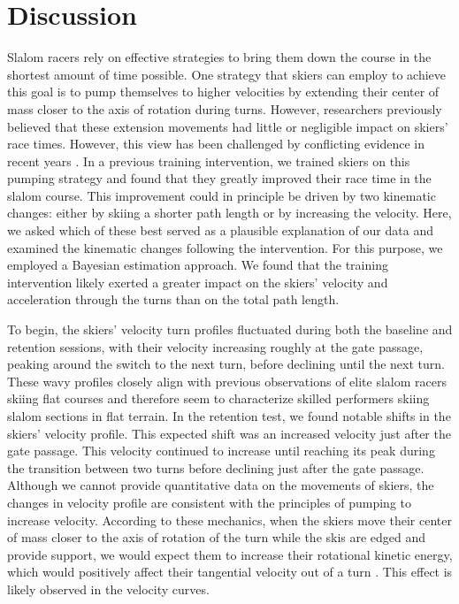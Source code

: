 \documentclass{article}
\begin{document}
\section{Discussion}

Slalom racers rely on effective strategies to bring them down the course in the shortest amount of time possible. One strategy that skiers can employ to achieve this goal is to pump themselves to higher velocities by extending their center of mass closer to the axis of rotation during turns\cite{lind_physics_2013}. However, researchers previously believed that these extension movements had little or negligible impact on skiers' race times. However, this view has been challenged by conflicting evidence in recent years \cite{supej_impact_2015, reid_kinematic_2010, supej_differential_2008, christian_magelssen_reinforcement_2024, magelssen_is_2022, supej_how_2010}. In a previous training intervention\cite{magelssen_is_2022}, we trained skiers on this pumping strategy and found that they greatly improved their race time in the slalom course. This improvement could in principle be driven by two kinematic changes: either by skiing a shorter path length or by increasing the velocity. Here, we asked which of these best served as a plausible explanation of our data and examined the kinematic changes following the intervention. For this purpose, we employed a Bayesian estimation approach. We found that the training intervention likely exerted a greater impact on the skiers' velocity and acceleration through the turns than on the total path length.

To begin, the skiers' velocity turn profiles fluctuated during both the baseline and retention sessions, with their velocity increasing roughly at the gate passage, peaking around the switch to the next turn, before declining until the next turn. These wavy profiles closely align with previous observations of elite slalom racers skiing flat courses \cite{supej_impact_2015} and therefore seem to characterize skilled performers skiing slalom sections in flat terrain. In the retention test, we found notable shifts in the skiers' velocity profile. This expected shift was an increased velocity just after the gate passage. This velocity continued to increase until reaching its peak during the transition between two turns before declining just after the gate passage. Although we cannot provide quantitative data on the movements of skiers, the changes in velocity profile are consistent with the principles of pumping to increase velocity. According to these mechanics, when the skiers move their center of mass closer to the axis of rotation of the turn while the skis are edged and provide support, we would expect them to increase their rotational kinetic energy, which would positively affect their tangential velocity out of a turn \cite{lind_physics_2013}. This effect is likely observed in the velocity curves.
\end{document}
